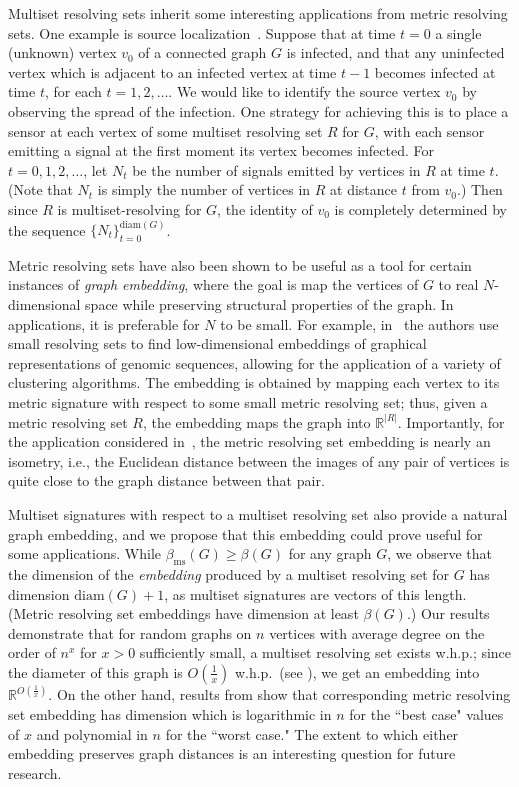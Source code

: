 \documentclass[12pt]{article}
\theoremstyle{definition}
\theoremstyle{remark}
\theoremstyle{remark}
\numberwithin{theorem}{section}
\providecommand{\R}{}
\renewcommand{\R}{\mathbb{R}}
\begin{document}
Multiset resolving sets inherit some interesting applications from metric resolving sets. One example is source localization~\cite[Section 7.1]{tillquist2023getting}. Suppose that at time $t = 0$ a single (unknown) vertex $v_{0}$ of a connected graph $G$ is infected, and that any uninfected vertex which is adjacent to an infected vertex at time $t-1$ becomes infected at time $t$, for each $t =1,2,\dots$. We would like to identify the source vertex $v_{0}$ by observing the spread of the infection. One strategy for achieving this is to place a sensor at each vertex of some multiset resolving set $R$ for $G$, with each sensor emitting a signal at the first moment its vertex becomes infected. For $t = 0,1,2,\dots$, let $N_{t}$ be the number of signals emitted by vertices in $R$ at time $t$. (Note that $N_{t}$ is simply the number of vertices in $R$ at distance $t$ from $v_{0}$.) Then since $R$ is multiset-resolving for $G$, the identity of $v_{0}$ is completely determined by the sequence $\{N_{t}\}_{t=0}^{\text{diam}(G)}$. 

Metric resolving sets have also been shown to be useful as a tool for certain instances of \textit{graph embedding}, where the goal is map the vertices of $G$ to real $N$-dimensional space while preserving structural properties of the graph. In applications, it is preferable for $N$ to be small. For example, in~\cite{tillquist2019low} the authors use small resolving sets to find low-dimensional embeddings of graphical representations of genomic sequences, allowing for the application of a variety of clustering algorithms. The embedding is obtained by mapping each vertex to its metric signature with respect to some small metric resolving set; thus, given a metric resolving set $R$, the embedding maps the graph into $\R^{|R|}$. Importantly, for the application considered in~\cite{tillquist2019low}, the metric resolving set embedding is nearly an isometry, i.e., the Euclidean distance between the images of any pair of vertices is quite close to the graph distance between that pair. 

Multiset signatures with respect to a multiset resolving set also provide a natural graph embedding, and we propose that this embedding could prove useful for some applications. While $\beta_{\text{ms}}(G) \geq \beta(G)$ for any graph $G$, we observe that the dimension of the \textit{embedding} produced by a multiset resolving set for $G$ has dimension $\text{diam}(G) + 1$, as multiset signatures are vectors of this length. (Metric resolving set embeddings have dimension at least $\beta(G)$.) Our results demonstrate that for random graphs on $n$ vertices with average degree on the order of $n^{x}$ for $x > 0$ sufficiently small, a multiset resolving set exists w.h.p.; since the diameter of this graph is $O\left( \frac{1}{x} \right)$ w.h.p.\ (see \cite{bollobas1998random}), we get an embedding into $\R^{O\left(\frac{1}{x}\right)}$. On the other hand, results from \cite{bollobas2013metric} show that corresponding metric resolving set embedding has dimension which is logarithmic in $n$ for the ``best case" values of $x$ and polynomial in $n$ for the ``worst case." The extent to which either embedding preserves graph distances is an interesting question for future research.
\end{document}
